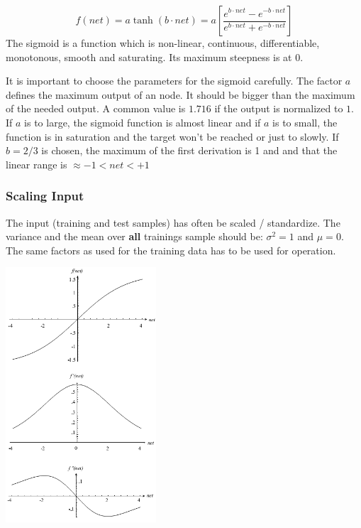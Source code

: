  \begin{minipage}{12cm}
 $$ f(net)=a \tanh(b \cdot net)= a \left[\frac{e^{b\cdot net}-e^{-b \cdot net}}{e^{b\cdot net}+ e^{-b\cdot net}}\right]$$
  The sigmoid is a function which is non-linear, continuous, differentiable, monotonous, smooth and saturating. Its maximum steepness is at 0.
  
  It is important to choose the parameters for the sigmoid carefully. The factor $a$ defines the maximum output of an node.
  It should be bigger than the maximum of the needed output. A common value is $1.716$ if the output is normalized to $1$.
  If $a$ is to large, the sigmoid function is almost linear and if $a$ is to small, the function is in saturation and the target won't be reached or just to slowly.
  If $b=2/3$ is chosen, the maximum of the first derivation is 1 and and that the linear range is $\approx -1 < net < +1$ 
  \subsubsection{Scaling Input}
  The input (training and test samples) has often be scaled / standardize. The variance and the mean over \textbf{all} trainings sample should be: 
  $\sigma^2=1$ and $\mu=0$. The same factors as used for the training data has to be used for operation.
  
  
 
 \end{minipage}
 \hspace{8mm}
 \begin{minipage}{5.6cm}
 \includegraphics[width=5.6cm]{./images/sigmoid.png}
 \end{minipage} 
 
